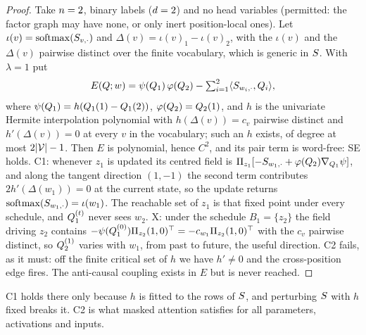 \begin{proof}
Take $n=2$, binary labels ($d=2$) and no head variables (permitted: the factor graph
may have none, or only inert position-local ones). Let $\iota(v) = \operatorname{softmax}(S_{v,\cdot})$
and $\Delta(v) = \iota(v)_1 - \iota(v)_2$, with the $\iota(v)$ and the $\Delta(v)$ pairwise
distinct over the finite vocabulary, which is generic in $S$. With $\lambda = 1$ put
%
\begin{equation}
\label{eq:sharp-energy}
  E(Q;w) = \psi(Q_1)\,\varphi(Q_2)
    - \textstyle\sum_{i=1}^{2}\langle S_{w_i,\cdot}, Q_i\rangle,
\end{equation}
%
where $\psi(Q_1) = h(Q_1(1) - Q_1(2))$, $\varphi(Q_2) = Q_2(1)$, and $h$ is the univariate
Hermite interpolation polynomial with $h(\Delta(v)) = c_v$ pairwise distinct and
$h'(\Delta(v)) = 0$ at every $v$ in the vocabulary; such an $h$ exists, of degree at most
$2|\mathcal{V}|-1$. Then $E$ is polynomial, hence $C^2$, and its pair term is word-free: SE holds.
C1: whenever $z_1$ is updated its centred field is
$\Pi_{z_1}[-S_{w_1,\cdot} + \varphi(Q_2)\nabla_{Q_1}\psi]$, and along the tangent
direction $(1,-1)$ the second term contributes $2h'(\Delta(w_1)) = 0$ at the current state, so
the update returns $\operatorname{softmax}(S_{w_1,\cdot}) = \iota(w_1)$. The reachable set of $z_1$ is
that fixed point under every schedule, and $Q_1^{(t)}$ never sees $w_2$. X: under the schedule
$B_1 = \{z_2\}$ the field driving $z_2$ contains
$-\psi(Q_1^{(0)})\Pi_{z_2}(1,0)^{\top} = -c_{w_1}\Pi_{z_2}(1,0)^{\top}$ with the $c_v$
pairwise distinct, so $Q_2^{(1)}$ varies with $w_1$, from past to future, the useful direction.
C2 fails, as it must: off the finite critical set of $h$ we have $h' \neq 0$ and the
cross-position edge fires. The anti-causal coupling exists in $E$ but is never reached.
\end{proof}

C1 holds there only because $h$ is fitted to the rows of $S$, and perturbing $S$ with
$h$ fixed breaks it. C2 is what masked attention satisfies for all parameters, activations and
inputs.

